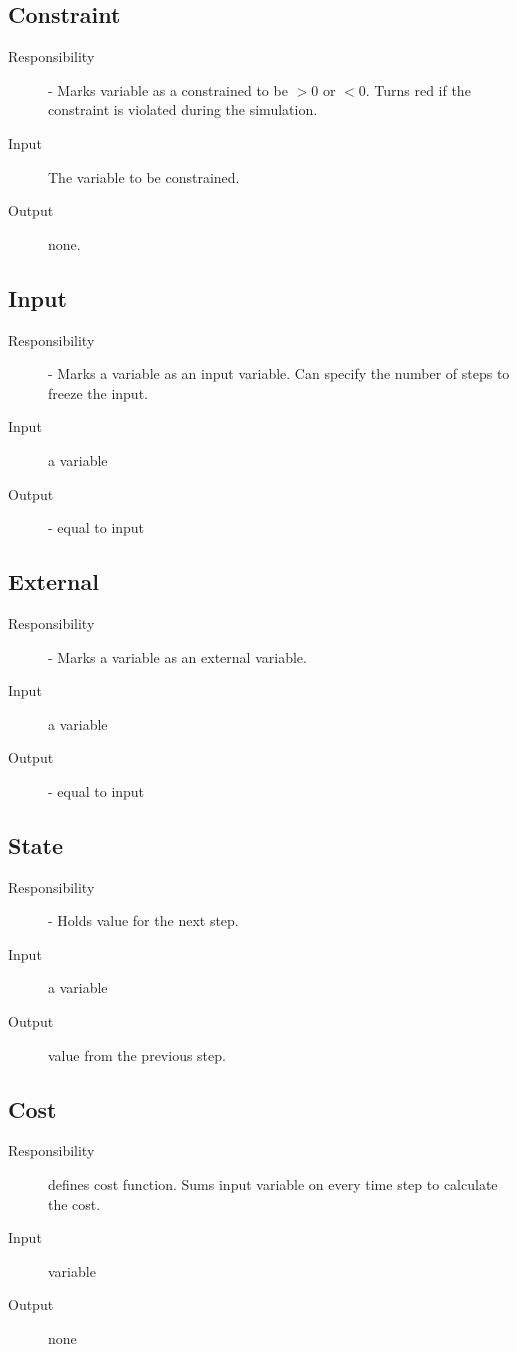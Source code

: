 \documentclass {article}
\begin{document}
\subsection{ Constraint}
\begin{description}
  \item [Responsibility] - Marks variable as a constrained to be $ >0$ or $<0$. Turns red if the constraint is violated during the simulation.
\item [Input] The variable to be constrained.
\item [Output] none.
\end{description}

\subsection{ Input}
\begin{description}
  \item [Responsibility] - Marks a variable as an input variable. Can specify the number of steps to freeze the input.
 \item [Input]  a variable
\item [Output] - equal to input
\end{description}

\subsection{ External}
\begin{description}
  \item [Responsibility] - Marks a variable as an external variable. 
 \item [Input]  a variable
\item [Output] - equal to input
\end{description}

\subsection{ State}
\begin{description}
  \item [Responsibility] - Holds value for the next step.
  \item [Input]  a variable
  \item [Output]  value from the previous step.
\end{description}

\subsection{ Cost}
\begin{description}
  \item [Responsibility]  defines cost function. Sums input variable on every
    time step to calculate the cost.
  \item [Input]  variable
  \item [Output] none
\end{description}
\end{document}
